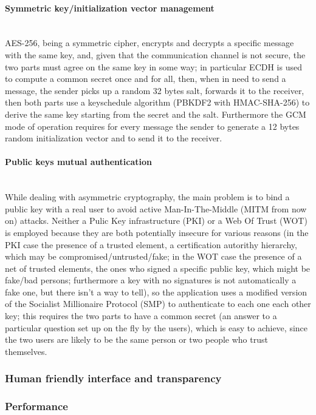 \documentclass[a4paper,12pt]{article}
\begin{document}
\paragraph{Symmetric key/initialization vector management} \hspace{0pt} \\
\small{AES-256, being a symmetric cipher, encrypts and decrypts a specific message with the same key, and, given that the communication channel is not secure, the two parts must agree on the same key in some way; in particular ECDH is used to compute a common secret once and for all, then, when in need to send a message, the sender picks up a random 32 bytes salt, forwards it to the receiver, then both parts use a keyschedule algorithm (PBKDF2 with HMAC-SHA-256) to derive the same key starting from the secret and the salt. Furthermore the GCM mode of operation requires for every message the sender to generate a 12 bytes random initialization vector and to send it to the receiver.}
\paragraph{Public keys mutual authentication} \hspace{0pt} \\
\small{While dealing with asymmetric cryptography, the main problem is to bind a public key with a real user to avoid active Man-In-The-Middle (MITM from now on) attacks. Neither a Pulic Key infrastructure (PKI) or a Web Of Trust (WOT) is employed because they are both potentially insecure for various reasons (in the PKI case the presence of a trusted element, a certification autorithy hierarchy, which may be compromised/untrusted/fake; in the WOT case the presence of a net of trusted elements, the ones who signed a specific public key, which might be fake/bad persons; furthermore a key with no signatures is not automatically a fake one, but there isn't a way to tell), so the application uses a modified version of the Socialist Millionaire Protocol (SMP) to authenticate to each one each other key; this requires the two parts to have a common secret (an answer to a particular question set up on the fly by the users), which is easy to achieve, since the two users are likely to be the same person or two people who trust themselves.}
\subsubsection{Human friendly interface and transparency}
\subsubsection{Performance}
\end{document}
